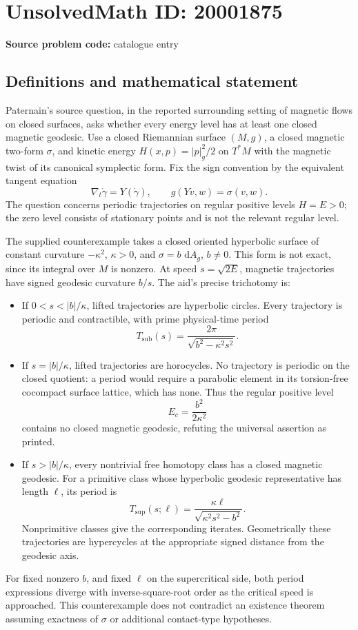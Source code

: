 \documentclass[11pt]{article}
\newcommand{\dd}{\,\mathrm{d}}
\begin{document}
\section*{UnsolvedMath ID: 20001875}
\textbf{Source problem code:} catalogue entry
\subsection{Definitions and mathematical statement}
Paternain's source question, in the reported surrounding setting of magnetic flows on closed surfaces, asks whether every energy level has at least one closed magnetic geodesic. Use a closed Riemannian surface \((M,g)\), a closed magnetic two-form \(\sigma\), and kinetic energy \(H(x,p)=|p|_g^2/2\) on \(T^*M\) with the magnetic twist of its canonical symplectic form. Fix the sign convention by the equivalent tangent equation
\[
 \nabla_t\dot\gamma=Y(\dot\gamma),\qquad
 g(Yv,w)=\sigma(v,w).
\]
The question concerns periodic trajectories on regular positive levels \(H=E>0\); the zero level consists of stationary points and is not the relevant regular level.

The supplied counterexample takes a closed oriented hyperbolic surface of constant curvature \(-\kappa^2\), \(\kappa>0\), and \(\sigma=b\,\dd A_g\), \(b\ne0\). This form is not exact, since its integral over \(M\) is nonzero. At speed \(s=\sqrt{2E}\), magnetic trajectories have signed geodesic curvature \(b/s\). The aid's precise trichotomy is:
\begin{itemize}
\item If \(0<s<|b|/\kappa\), lifted trajectories are hyperbolic circles. Every trajectory is periodic and contractible, with prime physical-time period
\[
 T_{\mathrm{sub}}(s)=\frac{2\pi}{\sqrt{b^2-\kappa^2s^2}}.
\]
\item If \(s=|b|/\kappa\), lifted trajectories are horocycles. No trajectory is periodic on the closed quotient: a period would require a parabolic element in its torsion-free cocompact surface lattice, which has none. Thus the regular positive level
\[
 E_c=\frac{b^2}{2\kappa^2}
\]
contains no closed magnetic geodesic, refuting the universal assertion as printed.
\item If \(s>|b|/\kappa\), every nontrivial free homotopy class has a closed magnetic geodesic. For a primitive class whose hyperbolic geodesic representative has length \(\ell\), its period is
\[
 T_{\mathrm{sup}}(s;\ell)=
 \frac{\kappa\ell}{\sqrt{\kappa^2s^2-b^2}}.
\]
Nonprimitive classes give the corresponding iterates. Geometrically these trajectories are hypercycles at the appropriate signed distance from the geodesic axis.
\end{itemize}
For fixed nonzero \(b\), and fixed \(\ell\) on the supercritical side, both period expressions diverge with inverse-square-root order as the critical speed is approached. This counterexample does not contradict an existence theorem assuming exactness of \(\sigma\) or additional contact-type hypotheses.
\end{document}
